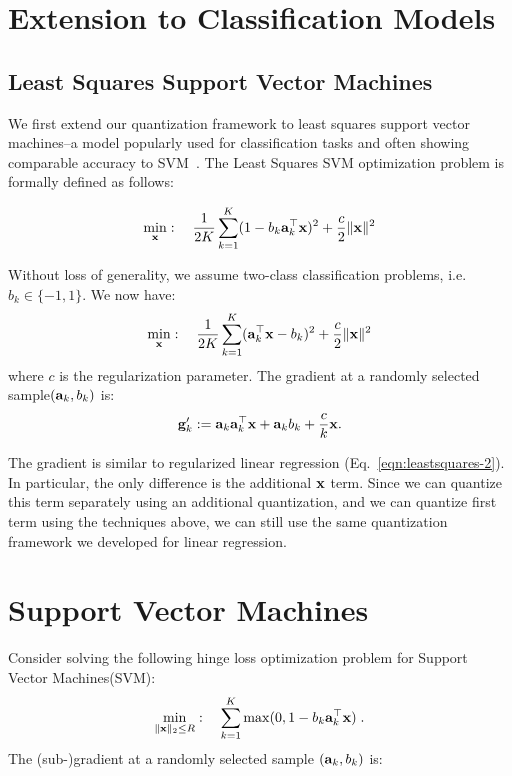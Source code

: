 \documentclass{article}
\def\a{{\bf a}}
\def\g{{\bf g}}
\def\x{{\bf x}}
\begin{document}
\section{Extension to Classification Models}

\subsection{Least Squares Support Vector Machines}

We first extend our quantization framework to 
least squares support vector machines--a model
popularly used for classification tasks and
often showing comparable accuracy to
SVM~\cite{ye2007svm}.
The  Least Squares SVM optimization problem is formally defined as follows: 

\begin{align*}
\min_{\x}:\quad {1\over 2K}\sum_{k=1}^K (1-b_k\a_k^\top \x)^2 + {c\over 2}\|\x\|^2
\end{align*}

\noindent Without
loss of generality, we assume two-class classification problems, i.e.  $b_k \in \{-1, 1\}$.
We now have:
\begin{align*}
\min_{\x}:\quad {1\over 2K}\sum_{k=1}^K (\a_k^\top \x - b_k)^2 + {c\over 2}\|\x\|^2
\end{align*}
where $c$ is the regularization parameter. The gradient at a randomly selected sample$(\a_k, b_k)$ is: 
\[
\g'_k := \a_k \a_k^\top \x + \a_k b_k + {c\over k} \x.
\]

The gradient is similar to regularized linear regression (Eq.~\ref{eqn:leastsquares-2}). 
In particular, the only difference is the additional $\x$ term.
Since we can quantize this term separately using an additional quantization, and we can quantize first term using the techniques above, we can still use 
the same quantization framework we developed
for linear regression.

\section{Support Vector Machines}

Consider solving the following hinge loss optimization problem for Support Vector Machines(SVM):
\begin{align*}
\min_{\| \x \|_2 \leq R}:\quad \sum_{k=1}^K \max(0, 1 - b_k \a_k^\top \x) \; .
\end{align*}
The (sub-)gradient at a randomly selected sample $(\a_k, b_k)$ is: 
\end{document}
